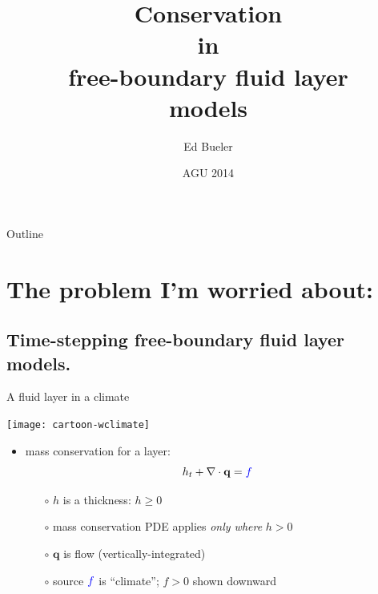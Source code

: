 \documentclass{beamer}
\title[Conservation in free-boundary layers] %
{Conservation \\ in \\ free-boundary fluid layer \\ models}
\author{Ed Bueler}
\institute[UAF] %
{
  Dept of Mathematics and Statistics, and Geophysical Institute\\
  University of Alaska Fairbanks%
}
\date{{\scriptsize AGU 2014}}
\newcommand\bq{\mathbf{q}}
\newcommand{\Div}{\nabla\cdot}
\begin{document}
\graphicspath{{../images/}{../../talks-public/commonfigs/}}

\begin{frame}
  \titlepage
\end{frame}

\begin{frame}{Outline}
  \tableofcontents
\end{frame}


\section{The problem I'm worried about:}

\subsection{Time-stepping free-boundary fluid layer models.}

\begin{frame}{A fluid layer in a climate}

\begin{center}
\texttt{[image: cartoon-wclimate]}
\end{center}

\vspace{-7mm}
  \begin{itemize}
  \item mass conservation for a layer:
      $$h_t + \Div\bq = {\color{blue} f}$$
    \begin{itemize}
    \vspace{-4mm}
    \item[$\circ$] $h$ is a thickness: $h\ge 0$
    \item[$\circ$] mass conservation PDE applies \emph{only where} $h>0$
    \item[$\circ$] $\bq$ is flow (vertically-integrated)
    \item[$\circ$] source ${\color{blue} f}$ is ``climate''; $f>0$ shown downward
    \end{itemize}
  \end{itemize}
\end{frame}
\end{document}
